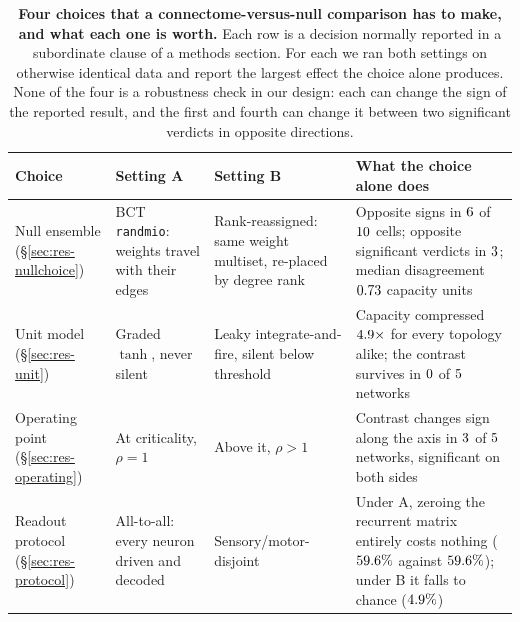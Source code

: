 \begin{table}[t]
\centering\small
\caption{\textbf{Four choices that a connectome-versus-null comparison has to make, and
what each one is worth.} Each row is a decision normally reported in a subordinate clause
of a methods section. For each we ran both settings on otherwise identical data and
report the largest effect the choice alone produces. None of the four is a robustness
check in our design: each can change the sign of the reported result, and the first and
fourth can change it between two significant verdicts in opposite directions.}
\label{tab:four-choices}
\begin{tabular}{p{}p{}p{}p{}}
\toprule
\textbf{Choice} & \textbf{Setting A} & \textbf{Setting B} & \textbf{What the choice alone
does} \\
\midrule
Null ensemble \newline (\S\ref{sec:res-nullchoice})
& BCT \texttt{randmio}: weights travel with their edges
& Rank-reassigned: same weight multiset, re-placed by degree rank
& Opposite signs in $6$ of $10$ cells; opposite significant
verdicts in $3$; median disagreement $0.73$ capacity
units \\
\addlinespace
Unit model \newline (\S\ref{sec:res-unit})
& Graded $\tanh$, never silent
& Leaky integrate-and-fire, silent below threshold
& Capacity compressed $4.9\times$ for every topology alike; the contrast
survives in $0$ of $5$ networks \\
\addlinespace
Operating point \newline (\S\ref{sec:res-operating})
& At criticality, $\rho = 1$
& Above it, $\rho > 1$
& Contrast changes sign along the axis in $3$ of $5$ networks,
significant on both sides \\
\addlinespace
Readout protocol \newline (\S\ref{sec:res-protocol})
& All-to-all: every neuron driven and decoded
& Sensory/motor-disjoint
& Under A, zeroing the recurrent matrix entirely costs nothing ($59.6\%$ against
$59.6\%$); under B it falls to chance ($4.9\%$) \\
\bottomrule
\end{tabular}
\end{table}

